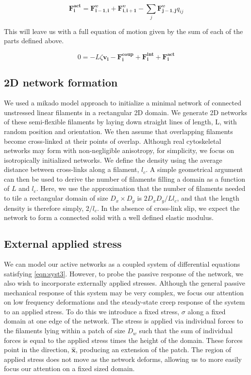\begin{equation}
\label{eqn:active}
\mathbf{F^{act}_{i}}=\mathbf{F^{\upsilon}_{i-1,i}} + \mathbf{F^{\upsilon}_{i,i+1}}
- \sum_{j}\mathbf{F^{\upsilon}_{j-1,j}}q_{ij}
\end{equation}


This will leave us with a full equation of motion given by the sum of each of the parts defined above.

\begin{equation}
\label{eqn:syst3}
0=-L\zeta\mathbf{ v_i} -\mathbf{F^{coup}_i}+ \mathbf{F^{int}_i}+\mathbf{F^{act}_i} 
\end{equation}

\subsection{2D network formation}

We used a mikado model approach \cite{Unterberger2014} to initialize a minimal network of connected unstressed linear filaments in a rectangular 2D domain. We generate 2D networks of these semi-flexible filaments by laying down straight lines of length, L, with random position and orientation. We then assume that overlapping filaments become cross-linked at their points of overlap. Although real cytoskeletal networks may form with non-negligible anisotropy, for simplicity, we focus on isotropically initialized networks. We define the density using the average distance between cross-links along a filament, $l_c$. A simple geometrical argument can then be used to derive the number of filaments filling a domain as a function of $L$ and $l_c$\cite{theo_hlm}.  Here, we use the approximation that the number of filaments needed to tile a rectangular domain of size $D_x \times D_y$  is $2D_xD_y/Ll_c$, and that the length density is therefore simply, $2/l_c$. In the absence of cross-link slip, we expect the network to form a connected solid with a well defined elastic modulus\cite{theo_hlm,theo_hlm2}.


\subsection{External applied stress}
We can model our active networks as a coupled system of differential equations satisfying \ref{eqn:syst3}.  However, to probe the passive response of the network, we also wish to incorporate externally applied stresses.  Although the general passive mechanical response of this system may be very complex, we focus our attention on low frequency deformations and the steady-state creep response of the system to an applied stress.  To do this we introduce a fixed stress, $\sigma$ along a fixed domain at one edge of the network.  The stress is applied via individual forces to the filaments lying within a patch of size $D_w$ such that the sum of individual forces is equal to the applied stress times the height of the domain.  These forces point in the direction, $\mathbf{\hat{x}}$, producing an extension of the patch.  The region of applied stress does not move as the network deforms, allowing us to more easily focus our attention on a fixed sized domain. 

